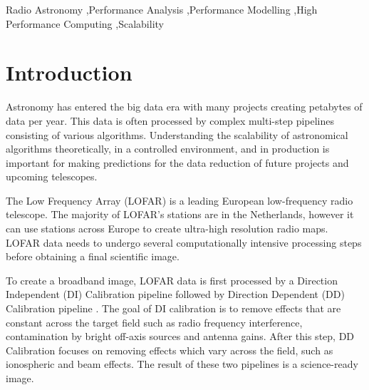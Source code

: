 \documentclass[preprint,5p]{elsarticle}
\begin{document}
\begin{frontmatter}
\begin{abstract}
\end{abstract}
\begin{keyword}
Radio Astronomy \sep Performance Analysis \sep Performance Modelling \sep High Performance Computing \sep Scalability


\end{keyword}
\end{frontmatter}

%

\section{\label{sec:intro}Introduction }

Astronomy has entered the big data era with many projects creating petabytes of data per year. This data is often processed by complex multi-step pipelines consisting of various algorithms. Understanding the scalability of astronomical algorithms theoretically, in a controlled environment, and in production is important for making predictions for the data reduction of future projects and upcoming telescopes. 

The Low Frequency Array (LOFAR) \citep{LOFAR} is a leading European low-frequency radio telescope. The majority of LOFAR's stations are in the Netherlands, however it can use stations across Europe to create ultra-high resolution radio maps. LOFAR data needs to undergo several computationally intensive processing steps before obtaining a final scientific image. 

To create a broadband image, LOFAR data is first processed by a Direction Independent (DI) Calibration pipeline followed by Direction Dependent (DD) Calibration pipeline \citep[e.g.][]{lofar_prefactor, Wendy_bootes,tassesmirnov, tasse2018faceting}. The goal of DI calibration is to remove effects that are constant across the target field such as radio frequency interference, contamination by bright off-axis sources and antenna gains. After this step, DD Calibration focuses on removing effects which vary across the field, such as ionospheric and beam effects. The result of these two pipelines is a science-ready image. 
\end{document}
